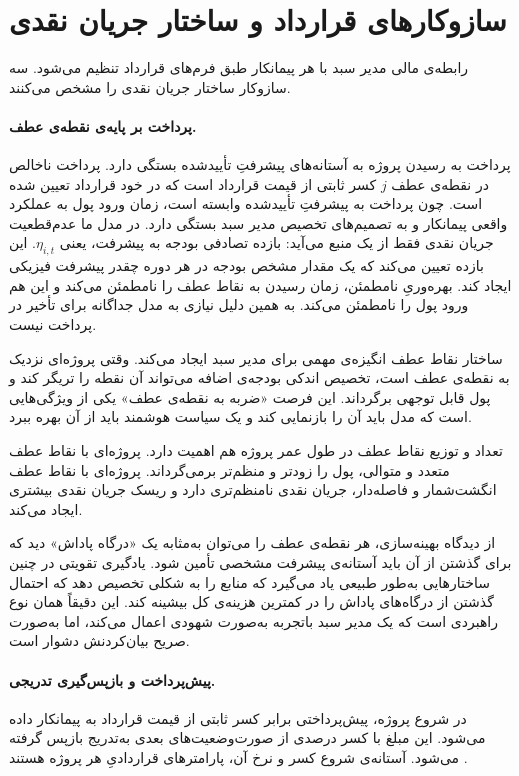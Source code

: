 \section{سازوکارهای قرارداد و ساختار جریان نقدی}
\label{sec:contract_mechanics}

رابطه‌ی مالی مدیر سبد با هر پیمانکار طبق فرم‌های قرارداد
 \citep{FIDIC2017} تنظیم می‌شود.
سه سازوکار ساختار جریان نقدی را مشخص می‌کنند.

\paragraph{پرداخت بر پایه‌ی نقطه‌ی عطف.}
پرداخت به رسیدن پروژه به آستانه‌های پیشرفتِ تأییدشده بستگی دارد.
پرداخت ناخالص در نقطه‌ی عطف $j$ کسر ثابتی از قیمت قرارداد است که
در خود قرارداد تعیین شده است.
چون پرداخت به پیشرفتِ تأییدشده وابسته است، زمان ورود پول به
عملکرد واقعی پیمانکار و به تصمیم‌های تخصیص مدیر سبد بستگی دارد.
در مدل ما عدم‌قطعیت جریان نقدی فقط از یک منبع می‌آید:
بازده تصادفی بودجه به پیشرفت، یعنی $\eta_{i,t}$.
این بازده تعیین می‌کند که یک مقدار مشخص بودجه در هر دوره
چقدر پیشرفت فیزیکی ایجاد کند.
بهره‌وریِ نامطمئن، زمان رسیدن به نقاط عطف را نامطمئن می‌کند و
این هم ورود پول را نامطمئن می‌کند. به همین دلیل نیازی به مدل جداگانه
برای تأخیر در پرداخت نیست.

ساختار نقاط عطف انگیزه‌ی مهمی برای مدیر سبد ایجاد می‌کند. وقتی
پروژه‌ای نزدیک به نقطه‌ی عطف است، تخصیص اندکی بودجه‌ی اضافه می‌تواند
آن نقطه را تریگر کند و پول قابل توجهی برگرداند. این فرصت
«ضربه به نقطه‌ی عطف» یکی از ویژگی‌هایی است که مدل باید آن را
بازنمایی کند و یک سیاست هوشمند باید از آن بهره ببرد.

تعداد و توزیع نقاط عطف در طول عمر پروژه هم اهمیت دارد. پروژه‌ای
با نقاط عطف متعدد و متوالی، پول را زودتر و منظم‌تر برمی‌گرداند.
پروژه‌ای با نقاط عطف انگشت‌شمار و فاصله‌دار، جریان نقدی
نامنظم‌تری دارد و ریسک جریان نقدی بیشتری ایجاد می‌کند.

از دیدگاه بهینه‌سازی، هر نقطه‌ی عطف را می‌توان به‌مثابه
یک «درگاه پاداش» دید که برای گذشتن از آن باید آستانه‌ی
پیشرفت مشخصی تأمین شود. یادگیری تقویتی در چنین ساختارهایی
به‌طور طبیعی یاد می‌گیرد که منابع را به شکلی تخصیص دهد که
احتمال گذشتن از درگاه‌های پاداش را در کمترین هزینه‌ی کل
بیشینه کند. این دقیقاً همان نوع راهبردی است که یک مدیر
سبد باتجربه به‌صورت شهودی اعمال می‌کند، اما به‌صورت صریح
بیان‌کردنش دشوار است.

\paragraph{پیش‌پرداخت و بازپس‌گیری تدریجی.}
در شروع پروژه، پیش‌پرداختی برابر کسر ثابتی از قیمت قرارداد به
پیمانکار داده می‌شود.
این مبلغ با کسر درصدی از صورت‌وضعیت‌های بعدی به‌تدریج بازپس
گرفته می‌شود. آستانه‌ی شروع کسر و نرخ آن، پارامترهای قراردادیِ
هر پروژه هستند \citep{FIDIC2017}.

